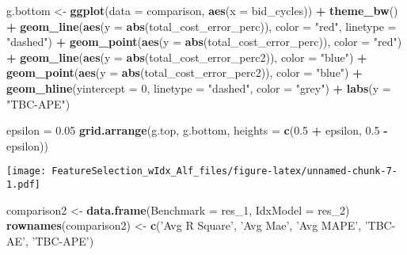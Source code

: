 \documentclass[]{article}
\newenvironment{Shaded}{\begin{snugshade}}{\end{snugshade}}
\newcommand{\KeywordTok}[1]{\textcolor[rgb]{0.13,0.29,0.53}{\textbf{#1}}}
\newcommand{\DataTypeTok}[1]{\textcolor[rgb]{0.13,0.29,0.53}{#1}}
\newcommand{\DecValTok}[1]{\textcolor[rgb]{0.00,0.00,0.81}{#1}}
\newcommand{\FloatTok}[1]{\textcolor[rgb]{0.00,0.00,0.81}{#1}}
\newcommand{\StringTok}[1]{\textcolor[rgb]{0.31,0.60,0.02}{#1}}
\newcommand{\OperatorTok}[1]{\textcolor[rgb]{0.81,0.36,0.00}{\textbf{#1}}}
\newcommand{\NormalTok}[1]{#1}
\begin{document}
\begin{Shaded}
\begin{Highlighting}[]
\NormalTok{g.bottom <-}\StringTok{ }\KeywordTok{ggplot}\NormalTok{(}\DataTypeTok{data =}\NormalTok{ comparison, }\KeywordTok{aes}\NormalTok{(}\DataTypeTok{x =}\NormalTok{ bid_cycles)) }\OperatorTok{+}
\StringTok{  }\KeywordTok{theme_bw}\NormalTok{() }\OperatorTok{+}
\StringTok{  }\KeywordTok{geom_line}\NormalTok{(}\KeywordTok{aes}\NormalTok{(}\DataTypeTok{y =} \KeywordTok{abs}\NormalTok{(total_cost_error_perc)), }\DataTypeTok{color =} \StringTok{"red"}\NormalTok{, }\DataTypeTok{linetype =} \StringTok{"dashed"}\NormalTok{) }\OperatorTok{+}
\StringTok{  }\KeywordTok{geom_point}\NormalTok{(}\KeywordTok{aes}\NormalTok{(}\DataTypeTok{y =} \KeywordTok{abs}\NormalTok{(total_cost_error_perc)), }\DataTypeTok{color =} \StringTok{"red"}\NormalTok{) }\OperatorTok{+}
\StringTok{  }\KeywordTok{geom_line}\NormalTok{(}\KeywordTok{aes}\NormalTok{(}\DataTypeTok{y =} \KeywordTok{abs}\NormalTok{(total_cost_error_perc2)), }\DataTypeTok{color =} \StringTok{"blue"}\NormalTok{) }\OperatorTok{+}
\StringTok{  }\KeywordTok{geom_point}\NormalTok{(}\KeywordTok{aes}\NormalTok{(}\DataTypeTok{y =} \KeywordTok{abs}\NormalTok{(total_cost_error_perc2)), }\DataTypeTok{color =} \StringTok{"blue"}\NormalTok{) }\OperatorTok{+}
\StringTok{  }\KeywordTok{geom_hline}\NormalTok{(}\DataTypeTok{yintercept =} \DecValTok{0}\NormalTok{, }\DataTypeTok{linetype =} \StringTok{"dashed"}\NormalTok{, }\DataTypeTok{color =} \StringTok{"grey"}\NormalTok{) }\OperatorTok{+}
\StringTok{  }\KeywordTok{labs}\NormalTok{(}\DataTypeTok{y =} \StringTok{"TBC-APE"}\NormalTok{)}

\NormalTok{epsilon =}\StringTok{ }\FloatTok{0.05}
\KeywordTok{grid.arrange}\NormalTok{(g.top, g.bottom, }\DataTypeTok{heights =} \KeywordTok{c}\NormalTok{(}\FloatTok{0.5} \OperatorTok{+}\StringTok{ }\NormalTok{epsilon, }\FloatTok{0.5} \OperatorTok{-}\StringTok{ }\NormalTok{epsilon))}
\end{Highlighting}
\end{Shaded}

\texttt{[image: FeatureSelection\_wIdx\_Alf\_files/figure-latex/unnamed-chunk-7-1.pdf]}

\begin{Shaded}
\begin{Highlighting}[]
\NormalTok{comparison2 <-}\StringTok{ }\KeywordTok{data.frame}\NormalTok{(}\DataTypeTok{Benchmark =}\NormalTok{ res_}\DecValTok{1}\NormalTok{, }\DataTypeTok{IdxModel =}\NormalTok{ res_}\DecValTok{2}\NormalTok{)}
\KeywordTok{rownames}\NormalTok{(comparison2) <-}\StringTok{ }\KeywordTok{c}\NormalTok{(}\StringTok{'Avg R Square'}\NormalTok{, }\StringTok{'Avg Mae'}\NormalTok{, }\StringTok{'Avg MAPE'}\NormalTok{, }\StringTok{'TBC-AE'}\NormalTok{, }\StringTok{'TBC-APE'}\NormalTok{)}
\end{Highlighting}
\end{Shaded}
\end{document}
